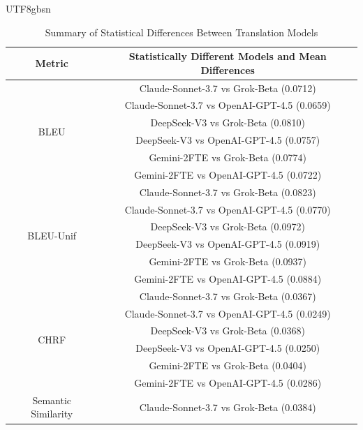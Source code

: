 \documentclass[conference]{IEEEtran}
\begin{document}
\begin{CJK}{UTF8}{gbsn}
\begin{table}[h]
    \centering
    \caption{Summary of Statistical Differences Between Translation Models}
    \begin{tabular}{cc}
        \hline
        \textbf{Metric} & \textbf{Statistically Different Models and Mean Differences} \\
        \hline
        \multirow{6}{}{BLEU} & Claude-Sonnet-3.7 vs Grok-Beta (0.0712) \\
                              & Claude-Sonnet-3.7 vs OpenAI-GPT-4.5 (0.0659) \\
                              & DeepSeek-V3 vs Grok-Beta (0.0810) \\
                              & DeepSeek-V3 vs OpenAI-GPT-4.5 (0.0757) \\
                              & Gemini-2FTE vs Grok-Beta (0.0774) \\
                              & Gemini-2FTE vs OpenAI-GPT-4.5 (0.0722) \\
        \hline
        \multirow{6}{}{BLEU-Unif} & Claude-Sonnet-3.7 vs Grok-Beta (0.0823) \\
                                   & Claude-Sonnet-3.7 vs OpenAI-GPT-4.5 (0.0770) \\
                                   & DeepSeek-V3 vs Grok-Beta (0.0972) \\
                                   & DeepSeek-V3 vs OpenAI-GPT-4.5 (0.0919) \\
                                   & Gemini-2FTE vs Grok-Beta (0.0937) \\
                                   & Gemini-2FTE vs OpenAI-GPT-4.5 (0.0884) \\
        \hline
        \multirow{6}{}{CHRF} & Claude-Sonnet-3.7 vs Grok-Beta (0.0367) \\
                              & Claude-Sonnet-3.7 vs OpenAI-GPT-4.5 (0.0249) \\
                              & DeepSeek-V3 vs Grok-Beta (0.0368) \\
                              & DeepSeek-V3 vs OpenAI-GPT-4.5 (0.0250) \\
                              & Gemini-2FTE vs Grok-Beta (0.0404) \\
                              & Gemini-2FTE vs OpenAI-GPT-4.5 (0.0286) \\
        \hline
        \multirow{6}{}{Semantic Similarity} & Claude-Sonnet-3.7 vs Grok-Beta (0.0384) \\

\end{tabular}
\end{table}
\end{CJK}
\end{document}

